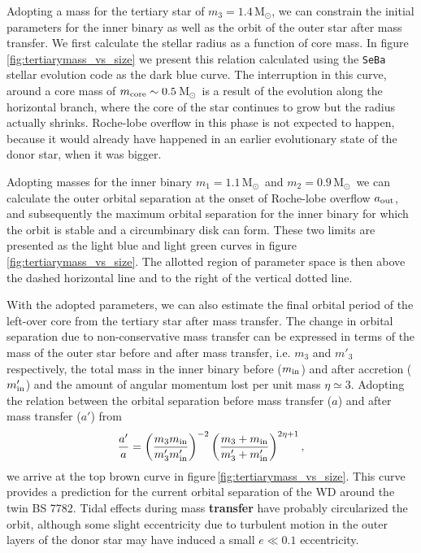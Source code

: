 \documentclass[twocolumn]{aastex62}
\newcommand{\MSun}{\mbox{M$_\odot$}}
\begin{document}
Adopting a mass for the tertiary star of $m_3 = 1.4$\,\MSun, we can
constrain the initial parameters for the inner binary as well as the
orbit of the outer star after mass transfer. We first calculate the
stellar radius as a function of core mass. In
figure\,\ref{fig:tertiarymass_vs_size} we present this relation
calculated using the {\tt SeBa} stellar evolution code
\citep{1996A&A...309..179P} as the dark blue curve.  The interruption
in this curve, around a core mass of $m_{\rm core} \sim 0.5$\,\MSun\,
is a result of the evolution along the horizontal branch, where the
core of the star continues to grow but the radius actually shrinks.
Roche-lobe overflow in this phase is not expected to happen, because
it would already have happened in an earlier evolutionary state of the
donor star, when it was bigger.

Adopting masses for the inner binary $m_1=1.1$\,\MSun\, and
$m_2=0.9$\,\MSun\, we can calculate the outer orbital separation at
the onset of Roche-lobe overflow $a_{\rm out}$, and subsequently the
maximum orbital separation for the inner binary for which the orbit is
stable and a circumbinary disk can form. These two limits are
presented as the light blue and light green curves in
figure\,\ref{fig:tertiarymass_vs_size}.  The allotted region of
parameter space is then above the dashed horizontal line and to the
right of the vertical dotted line.

With the adopted parameters, we can also estimate the final orbital
period of the left-over core from the tertiary star after 
mass transfer.  The change in orbital separation due to
non-conservative mass transfer can be expressed in terms of the mass
of the outer star before and after mass transfer, i.e. $m_3$ and $m'_3$
respectively, the total mass in the inner binary before ($m_{\rm in}$)
and after accretion ($m'_{\rm in}$) and the amount of angular momentum
lost per unit mass $\eta \simeq 3$. Adopting the relation between the
orbital separation before mass transfer ($a$) and after mass transfer
($a'$) from \cite{1995A&A...296..691P}
\begin{equation}
  {a' \over a} = \left( {m_3 m_{\rm in} \over m'_3 m'_{\rm in}} \right)^{-2}
  \left( {m_3 + m_{\rm in} \over m'_3 + m'_{\rm in}} \right)^{2\eta + 1},
\end{equation}
we arrive at the top brown curve in
figure\,\ref{fig:tertiarymass_vs_size}. This curve provides a prediction for 
the current orbital separation of the WD around the twin
BS 7782. Tidal effects during mass \textbf{transfer}
have probably circularized the orbit, although some slight eccentricity
due to turbulent motion in the outer layers of the donor star may have
induced a small $e \ll 0.1$ eccentricity.
\end{document}
